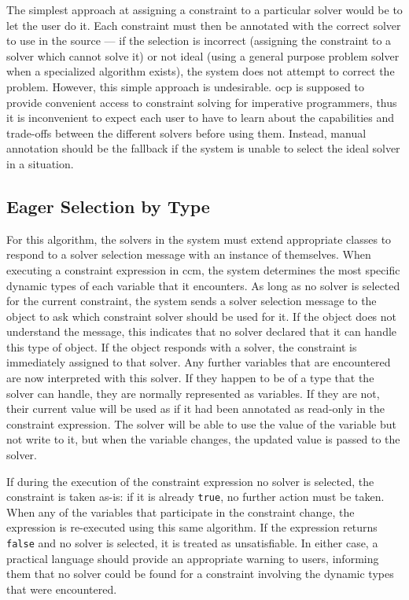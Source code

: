 The simplest approach at assigning a constraint to a particular solver
would be to let the user do it. Each constraint must then be annotated
with the correct solver to use in the source --- if the selection is
incorrect (\ie assigning the constraint to a solver which cannot solve
it) or not ideal (\ie using a general purpose problem solver when a
specialized algorithm exists), the system does not attempt to correct
the problem. However, this simple approach is undesirable. \ac{ocp} is
supposed to provide convenient access to constraint solving for
imperative programmers, thus it is inconvenient to expect each user to
have to learn about the capabilities and trade-offs between the
different solvers before using them. Instead, manual annotation should
be the fallback if the system is unable to select the ideal solver in
a situation.

\subsection{Eager Selection by Type}
For this algorithm, the solvers in the system must extend appropriate
classes to respond to a solver selection message with an instance of
themselves.  When executing a constraint expression in \gls{ccm}, the
system determines the most specific dynamic types of each variable
that it encounters. As long as no solver is selected for the current
constraint, the system sends a solver selection message to the object
to ask which constraint solver should be used for it. If the object
does not understand the message, this indicates that no solver
declared that it can handle this type of object. If the object
responds with a solver, the constraint is immediately assigned to that
solver. Any further variables that are encountered are now interpreted
with this solver. If they happen to be of a type that the solver can
handle, they are normally represented as variables. If they are not,
their current value will be used as if it had been annotated as
read-only in the constraint expression. The solver will be able to use
the value of the variable but not write to it, but when the variable
changes, the updated value is passed to the solver.

If during the execution of the constraint expression no solver is
selected, the constraint is taken as-is: if it is already \verb!true!,
no further action must be taken. When any of the variables that
participate in the constraint change, the expression is re-executed
using this same algorithm. If the expression returns \verb!false! and
no solver is selected, it is treated as unsatisfiable. In either case,
a practical language should provide an appropriate warning to users,
informing them that no solver could be found for a constraint
involving the dynamic types that were encountered.

